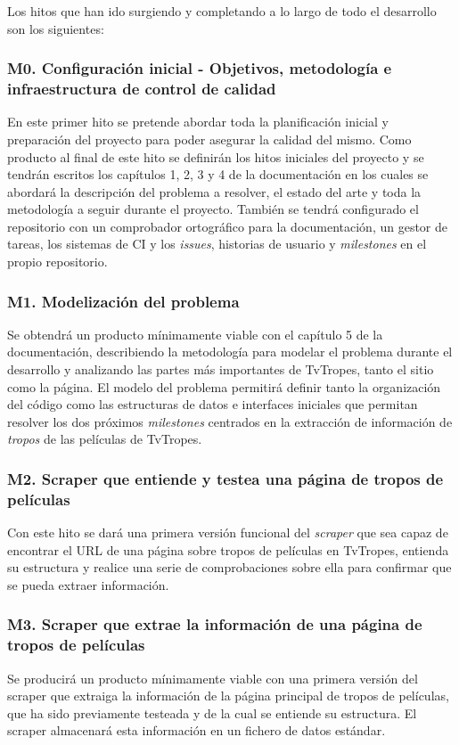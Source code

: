 Los hitos que han ido surgiendo y completando a lo largo de todo el desarrollo
son los siguientes:

\subsubsection{M0. Configuración inicial - Objetivos, metodología e infraestructura de control de calidad}
En este primer hito se pretende abordar toda la planificación inicial y
preparación del proyecto para poder asegurar la calidad del mismo. Como producto
al final de este hito se definirán los hitos iniciales del proyecto y se tendrán
escritos los capítulos 1, 2, 3 y 4 de la documentación en los cuales se abordará
la descripción del problema a resolver, el estado del arte y toda la metodología
a seguir durante el proyecto. También se tendrá configurado el repositorio con
un comprobador ortográfico para la documentación, un gestor de tareas, los
sistemas de CI y los \textit{issues}, historias de usuario y \textit{milestones}
en el propio repositorio.

\subsubsection{M1. Modelización del problema}
Se obtendrá un producto mínimamente viable con el capítulo 5 de la
documentación, describiendo la metodología para modelar el problema durante el
desarrollo y analizando las partes más importantes de TvTropes, tanto el sitio
como la página. El modelo del problema permitirá definir tanto la organización
del código como las estructuras de datos e interfaces iniciales que permitan
resolver los dos próximos \textit{milestones} centrados en la extracción de
información de \textit{tropos} de las películas de TvTropes.

\subsubsection{M2. Scraper que entiende y testea una página de tropos de películas}
Con este hito se dará una primera versión funcional del \textit{scraper} que sea
capaz de encontrar el URL de una página sobre tropos de películas en TvTropes,
entienda su estructura y realice una serie de comprobaciones sobre ella para
confirmar que se pueda extraer información.

\subsubsection{M3. Scraper que extrae la información de una página de tropos de películas}
Se producirá un producto mínimamente viable con una primera versión del scraper
que extraiga la información de la página principal de tropos de películas, que
ha sido previamente testeada y de la cual se entiende su estructura. El scraper
almacenará esta información en un fichero de datos estándar.

